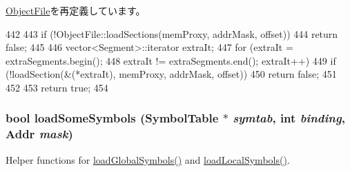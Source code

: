 \hyperlink{classObjectFile_a69ba3469bb66a1ffa5049d581c1faf70}{ObjectFile}を再定義しています。


\begin{DoxyCode}
442 {
443     if (!ObjectFile::loadSections(memProxy, addrMask, offset))
444         return false;
445 
446     vector<Segment>::iterator extraIt;
447     for (extraIt = extraSegments.begin();
448             extraIt != extraSegments.end(); extraIt++) {
449         if (!loadSection(&(*extraIt), memProxy, addrMask, offset)) {
450             return false;
451         }
452     }
453     return true;
454 }
\end{DoxyCode}
\hypertarget{classElfObject_a0e172c4c18ce097d56ab99e41baed39b}{
\subsubsection[{loadSomeSymbols}]{\setlength{\rightskip}{0pt plus 5cm}bool loadSomeSymbols (SymbolTable $\ast$ {\em symtab}, \/  int {\em binding}, \/  {\bf Addr} {\em mask})}}
\label{classElfObject_a0e172c4c18ce097d56ab99e41baed39b}


Helper functions for \hyperlink{classElfObject_a1de102f86bbb53d20455d9e78be53935}{loadGlobalSymbols()} and \hyperlink{classElfObject_aab9393b89c15838ac1b842e642f981bb}{loadLocalSymbols()}. 


